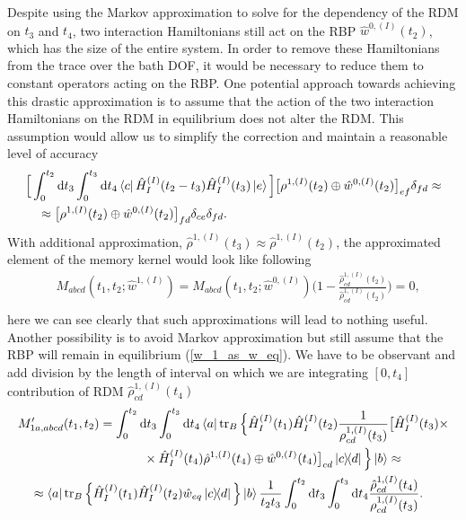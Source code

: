 Despite using the Markov approximation to solve for the dependency of the RDM on $t_3$ and $t_4$, two interaction Hamiltonians still act on the RBP $\hat{w}^{0, (I)}(t_2)$, which has the size of the entire system. In order to remove these Hamiltonians from the trace over the bath DOF, it would be necessary to reduce them to constant operators acting on the RBP. One potential approach towards achieving this drastic approximation is to assume that the action of the two interaction Hamiltonians on the RDM in equilibrium does not alter the RDM. This assumption would allow us to simplify the correction and maintain a reasonable level of accuracy
\begin{equation}
    \begin{aligned}
    &\Big[\int_{0}^{t_2} \mathrm{d} t_3 \int_{0}^{t_3} \mathrm{d} t_4 \bra{c}\hat{H}_{I}^{(I)}(t_2 - t_3) \hat{H}_{I}^{(I)}(t_3) \ket{e} \Big]\big[\rho^{1, (I)}(t_2) \oplus \hat{w}^{0, (I)}(t_2)\big]_{ef} \delta_{fd} \approx \\
    &\quad \approx \big[\rho^{1, (I)}(t_2) \oplus \hat{w}^{0, (I)}(t_2)\big]_{fd} \delta_{ce} \delta_{fd}.
    \end{aligned} 
\end{equation}
With additional approximation, $\hat{\rho}^{1, (I)}(t_3) \approx \hat{\rho}^{1, (I)}(t_2)$, the approximated element of the memory kernel would look like following
\begin{equation}
\label{w_1_as_w_eq}
    \begin{aligned}
    &M_{abcd}(t_1, t_2; \hat{w}^{1,(I)}) = M_{abcd}(t_1, t_2; \hat{w}^{0,(I)}) \Big( 1 - \frac{\hat{\rho}_{cd}^{1, (I)}(t_2)}{\hat{\rho}_{cd}^{1, (I)}(t_2)}\Big) = 0,\\
    \end{aligned}
\end{equation}
here we can see clearly that such approximations will lead to nothing useful. Another possibility is to avoid Markov approximation but still assume that the RBP will remain in equilibrium (\ref{w_1_as_w_eq}). We have to be observant and add division by the length of interval on which we are integrating $[0, t_4]$ contribution of RDM $\hat{\rho}_{cd}^{1, (I)}(t_4)$
\begin{equation}
\label{w_1_as_w_eq_weighted}
    \begin{aligned}
    &M_{1a,abcd}^\prime(t_1, t_2) = \int_{0}^{t_2} \mathrm{d} t_3 \int_{0}^{t_3} \mathrm{d} t_4 \bra{a}\operatorname{tr}_B \Big\{ \hat{H}_{I}^{(I)}(t_1) \hat{H}_{I}^{(I)}(t_2) \frac{1}{\rho_{cd}^{1, (I)}(t_3)}\big[\hat{H}_{I}^{(I)}(t_3) \times \\
    & \quad \quad \quad \quad \quad \quad \quad \quad \quad \quad  \times\hat{H}_{I}^{(I)}(t_4) \hat{\rho}^{1, (I)}(t_4) \oplus \hat{w}^{0, (I)}(t_4)\big]_{cd} \ketbra{c}{d}\Big\} \ket{b} \approx \\
    & \quad \approx  \bra{a}\operatorname{tr}_B \Big\{ \hat{H}_{I}^{(I)}(t_1) \hat{H}_{I}^{(I)}(t_2)  \hat{w}_{eq}\ketbra{c}{d} \Big\} \ket{b} \frac{1}{t_2 t_3} \int_{0}^{t_2} \mathrm{d} t_3 \int_{0}^{t_3} \mathrm{d} t_4 \frac{\hat{\rho}_{cd}^{1, (I)}(t_4)}{\rho_{cd}^{1, (I)}(t_3)}.
    \end{aligned} 
\end{equation}
